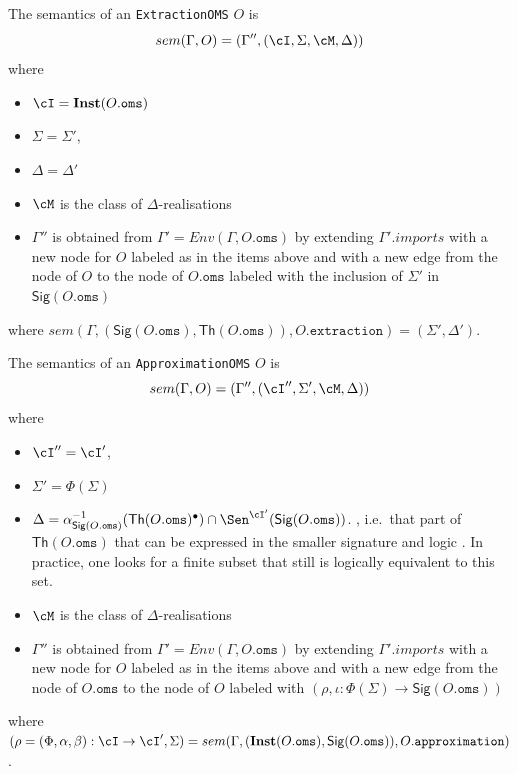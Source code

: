 \documentclass[10pt, a4paper]{isov2}
\newcommand*{\syntax}[1]{\texttt{#1}}
\newcommand{\Sig}{\mathsf{Sig}}
\renewcommand{\Th}{\mathsf{Th}}
\newcommand{\Inst}{\ensuremath{\mathbf{Inst}}}
\begin{document}
The semantics of an \syntax{ExtractionOMS} $O$
is
$$sem(\Gamma, O) = (\Gamma'',(\cI,\Sigma,\cM,\Delta))$$
\noindent where
\begin{itemize}
  \item $\cI = \Inst(O.\syntax{oms})$
  \item $\Sigma = \Sigma'$,
  \item $\Delta = \Delta'$
  \item $\cM$ is the class of $\Delta$-realisations
  \item $\Gamma''$ is obtained from 
       $\Gamma' = Env(\Gamma, O.\syntax{oms})$
       by extending $\Gamma'.imports$
        with a new node for $O$ labeled as in the items above
        and with a new edge from the node of $O$ to the node of 
        $O.\syntax{oms}$ labeled with
        the inclusion of $\Sigma'$ in $\Sig(O.\syntax{oms})$
\end{itemize}
where 
$sem(\Gamma, (\Sig(O.\syntax{oms}), \Th(O.\syntax{oms})), O.\syntax{extraction}) = 
(\Sigma',\Delta')$.

The semantics of an \syntax{ApproximationOMS} $O$ is
$$sem(\Gamma, O) = (\Gamma'',(\cI'',\Sigma',\cM,\Delta))$$
\noindent where
\begin{itemize}
  \item $\cI'' = \cI'$,
  \item $\Sigma' = \Phi(\Sigma)$
  \item $\Delta = \alpha^{-1}_{\Sig(O.\syntax{oms})}(\Th(O.\syntax{oms})^\bullet)\cap\Sen^{\cI'}(\Sig(O.\syntax{oms}))$.
, i.e.\ that part of $\Th(O.\syntax{oms})$ that can be expressed in the smaller signature and logic . In  practice, one looks for a finite subset that still is logically equivalent to this set.
  \item $\cM$ is the class of $\Delta$-realisations
  \item $\Gamma''$ is obtained from 
       $\Gamma' = Env(\Gamma, O.\syntax{oms})$
       by extending $\Gamma'.imports$
        with a new node for $O$ labeled as in the items above
        and with a new edge from the node of $O.\syntax{oms}$ to the node of $O$ 
        labeled with $(\rho,\iota: \Phi(\Sigma) \to \Sig(O.\syntax{oms}))$ 
\end{itemize}
\noindent where $(\rho = (\Phi,\alpha,\beta):\cI\to\cI',\Sigma) = sem(\Gamma, (\Inst(O.\syntax{oms}), \Sig(O.\syntax{oms})), O.\syntax{approximation})$.
\end{document}
